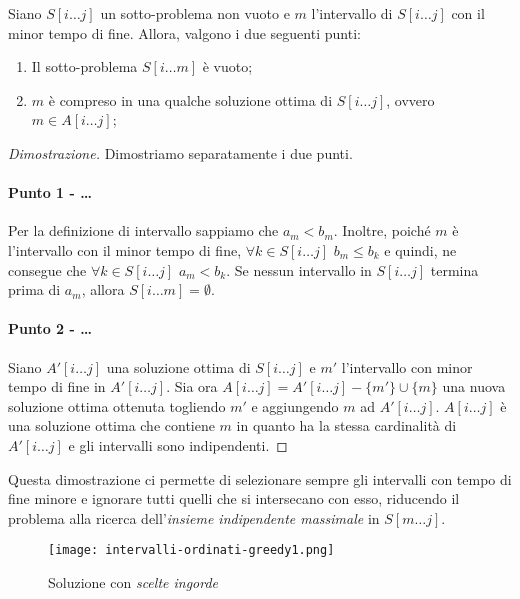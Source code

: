 \begin{definition}
    Siano $S[i\dots j]$ un sotto-problema non vuoto e $m$ l'intervallo di $S[i\dots
    j]$ con il minor tempo di fine. Allora, valgono i due seguenti punti:
    \begin{enumerate}
        \item Il sotto-problema $S[i\dots m]$ è vuoto;
        \item $m$ è compreso in una qualche soluzione ottima di $S[i\dots j]$,
        ovvero $m\in A[i\dots j]$;
    \end{enumerate}
\end{definition}
\begin{proof}[Dimostrazione]
    Dimostriamo separatamente i due punti.

    \paragraph{Punto 1 - \bm{$S[i$}\dots\bm{$ j]=\emptyset$}}
    Per la definizione di intervallo sappiamo che $a_m<b_m$. Inoltre, poiché $m$
    è l'intervallo con il minor tempo di fine, $\forall k\in S[i\dots j]$ $b_m
    \leq b_k$ e quindi, ne consegue che $\forall k\in S[i\dots j]$ $a_m<b_k$.
    Se nessun intervallo in $S[i\dots j]$ termina prima di $a_m$, allora $S[i
    \dots m]=\emptyset$.

    \paragraph*{Punto 2 - \bm{$m\in A[i$}\dots\bm{$i]$}}
    Siano $A'[i\dots j]$ una soluzione ottima di $S[i\dots j]$ e $m'$ l'intervallo
    con minor tempo di fine in $A'[i\dots j]$. Sia ora $A[i\dots j]=A'[i\dots j]
    -\{m'\}\cup\{m\}$ una nuova soluzione ottima ottenuta togliendo $m'$ e
    aggiungendo $m$ ad $A'[i\dots j]$. $A[i\dots j]$ è una soluzione ottima che
    contiene $m$ in quanto ha la stessa cardinalità di $A'[i\dots j]$ e gli
    intervalli sono indipendenti.
\end{proof}

\noindent
Questa dimostrazione ci permette di selezionare sempre gli intervalli con tempo
di fine minore e ignorare tutti quelli che si intersecano con esso, riducendo
il problema alla ricerca dell'\emph{insieme indipendente massimale} in $S[m\dots
j]$.

\begin{figure}[h!]
    \centering
    \texttt{[image: intervalli-ordinati-greedy1.png]}
    \caption{Soluzione con \emph{scelte ingorde}}
\end{figure}

